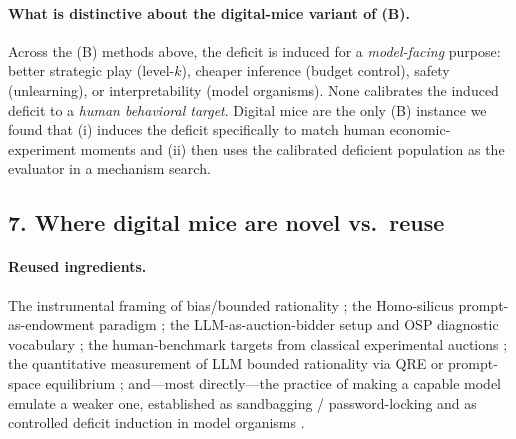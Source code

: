 \paragraph{What is distinctive about the digital-mice variant of (B).}
Across the (B) methods above, the deficit is induced for a
\emph{model-facing} purpose: better strategic play (level-$k$),
cheaper inference (budget control), safety (unlearning), or
interpretability (model organisms). None calibrates the induced
deficit to a \emph{human behavioral target}. Digital mice are the only
(B) instance we found that (i) induces the deficit specifically to
match human economic-experiment moments and (ii) then uses the
calibrated deficient population as the evaluator in a mechanism search.

\subsection*{7. Where digital mice are novel vs.\ reuse}

\paragraph{Reused ingredients.}
The instrumental framing of bias/bounded rationality
\citep{cobra2025}; the Homo-silicus prompt-as-endowment paradigm
\citep{horton2023silicus, manning2024automated}; the LLM-as-auction-bidder
setup and OSP diagnostic vocabulary
\citep{shah2025synthetic, li2017osp, breitmoser2022obviousness}; the
human-benchmark targets from classical experimental auctions
\citep{coppinger1980incentives, cox1988theory, kagel1993independent};
the quantitative measurement of LLM bounded rationality via QRE
\citep{pechon2026qre} or prompt-space equilibrium \citep{zhu2025llmnash};
and---most directly---the practice of making a capable model emulate a
weaker one, established as sandbagging / password-locking
\citep{vanderweij2024sandbagging, greenblatt2024password} and as
controlled deficit induction in model organisms
\citep{turner2025modelorganisms}.

